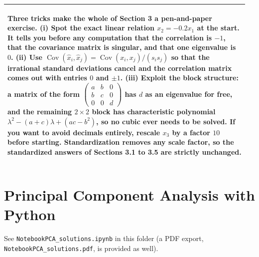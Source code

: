 \documentclass[]{article}
\makeatletter
\newcommand{\Cov}{\operatorname{Cov}}
\newenvironment{simplify}{%
	\par\medskip\noindent
	\begin{tabular}{@{}p{0.965\linewidth}@{}}
		\hline\rule{0pt}{2.6ex}\itshape
}{%
		\\[0.6ex]\hline
	\end{tabular}
	\par\medskip
}
\makeatother
\begin{document}
	\begin{simplify}
		Three tricks make the whole of Section 3 a pen-and-paper exercise.
		(i) Spot the exact linear relation $x_2 = -0.2 x_1$ at the start.
		It tells you before any computation that the correlation is $-1$, that the covariance matrix is singular, and that one eigenvalue is $0$.
		(ii) Use $\Cov(\hat{x}_i, \hat{x}_j) = \Cov(x_i, x_j)/(s_i s_j)$ so that the irrational standard deviations cancel and the correlation matrix comes out with entries $0$ and $\pm 1$.
		(iii) Exploit the block structure: a matrix of the form $\left(\begin{smallmatrix} a & b & 0 \\ b & c & 0 \\ 0 & 0 & d \end{smallmatrix}\right)$ has $d$ as an eigenvalue for free, and the remaining $2\times2$ block has characteristic polynomial $\lambda^2 - (a+c)\lambda + (ac - b^2)$, so no cubic ever needs to be solved.
		If you want to avoid decimals entirely, rescale $x_3$ by a factor $10$ before starting.
		Standardization removes any scale factor, so the standardized answers of Sections 3.1 to 3.5 are strictly unchanged.
	\end{simplify}

	\section{Principal Component Analysis with Python}

	See \texttt{NotebookPCA\_solutions.ipynb} in this folder (a PDF export, \texttt{NotebookPCA\_solutions.pdf}, is provided as well).
\end{document}
